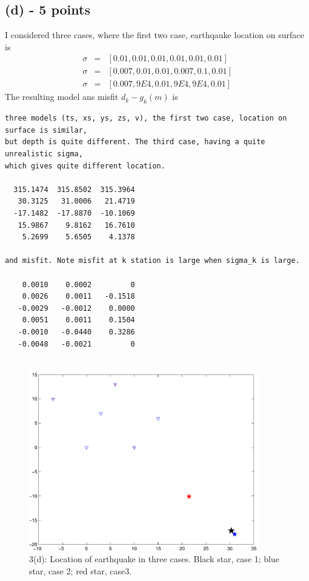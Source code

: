 \documentclass[11pt]{article}
\begin{document}
\subsection*{(d) - 5 points}
I considered three cases, where the first two case, earthqauke location on surface is 
\begin{eqnarray*}
\sigma&=&[0.01,0.01,0.01,0.01,0.01,0.01]\\
\sigma&=&[0.007,0.01,0.01,0.007,0.1,0.01]\\
\sigma&=&[0.007,9E4,0.01,9E4,9E4,0.01]
\end{eqnarray*}
The resulting model ans misfit $d_k - g_k(m)$ is
\begin{verbatim}
three models (ts, xs, ys, zs, v), the first two case, location on surface is similar, 
but depth is quite different. The third case, having a quite unrealistic sigma,
which gives quite different location. 

  315.1474  315.8502  315.3964
   30.3125   31.0006   21.4719
  -17.1482  -17.8870  -10.1069
   15.9867    9.8162   16.7610
    5.2699    5.6505    4.1378

and misfit. Note misfit at k station is large when sigma_k is large. 

    0.0010    0.0002         0
    0.0026    0.0011   -0.1518
   -0.0029   -0.0012    0.0000
    0.0051    0.0011    0.1504
   -0.0010   -0.0440    0.3286
   -0.0048   -0.0021         0
   
\end{verbatim}
\begin{figure}
  \includegraphics[width=10cm]{fig1.pdf}
  \caption{3(d): Location of earthquake in three cases. Black star, case 1; blue star, case 2; red star, case3.} 
\end{figure}


\end{document}
